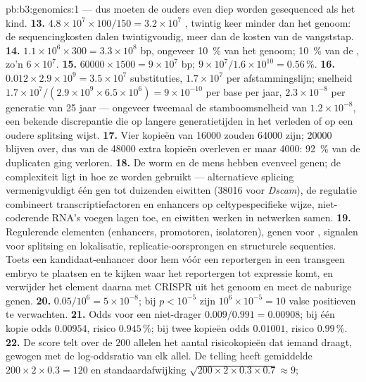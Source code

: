 \begin{solution}{pb:b3:genomics:1}
--- dus moeten de ouders even diep worden gesequenced als het kind.
\textbf{13.} $4.8\times 10^{7}\times 100/150 = 3.2\times 10^{7}$ ,
twintig keer minder dan het genoom: de sequencingkosten dalen
twintigvoudig, meer dan de kosten van de vangststap.
\textbf{14.} $1.1\times 10^{6}\times 300 = 3.3\times 10^{8}$ bp, ongeveer
\qty{10}{\%} van het genoom; \qty{10}{\%} van de , zo'n $6\times
10^{7}$.
\textbf{15.} $\num{60000}\times 1500 = 9\times 10^{7}$ bp; $9\times
10^{7}/1.6\times 10^{10} = 0.56\,\%$.
\textbf{16.} $0.012\times 2.9\times 10^{9} = 3.5\times 10^{7}$
substituties, $1.7\times 10^{7}$ per afstammingslijn; snelheid $1.7\times
10^{7}/(2.9\times 10^{9}\times 6.5\times 10^{6}) = 9\times 10^{-10}$
per base per jaar, $2.3\times 10^{-8}$ per generatie van 25 jaar ---
ongeveer tweemaal de stamboomsnelheid van $1.2\times 10^{-8}$, een
bekende discrepantie die op langere generatietijden in het verleden of
op een oudere splitsing wijst.
\textbf{17.} Vier kopieën van \num{16000} zouden \num{64000} zijn;
\num{20000} blijven over, dus van de \num{48000} extra kopieën
overleven er maar \num{4000}: \qty{92}{\%} van de duplicaten ging
verloren.
\textbf{18.} De worm en de mens hebben evenveel genen; de complexiteit
ligt in hoe ze worden gebruikt --- alternatieve splicing vermenigvuldigt
één gen tot duizenden eiwitten (\num{38016} voor \emph{Dscam}), de
regulatie combineert transcriptiefactoren en enhancers op
celtypespecifieke wijze, niet-coderende RNA's voegen lagen toe, en
eiwitten werken in netwerken samen.
\textbf{19.} Regulerende elementen (enhancers, promotoren, isolatoren),
genen voor , signalen voor splitsing en lokalisatie,
replicatie-oorsprongen en structurele sequenties. Toets een
kandidaat-enhancer door hem vóór een reportergen in een transgeen embryo
te plaatsen en te kijken waar het reportergen tot expressie komt, en
verwijder het element daarna met CRISPR uit het genoom en meet de
naburige genen.
\textbf{20.} $0.05/10^{6} = 5\times 10^{-8}$; bij $p < 10^{-5}$ zijn
$10^{6}
\times 10^{-5} = 10$ valse positieven te verwachten.
\textbf{21.} Odds voor een niet-drager $0.009/0.991 = 0.00908$; bij één
kopie odds $0.00954$, risico $0.945\,\%$; bij twee kopieën odds
$0.01001$, risico $0.99\,\%$.
\textbf{22.} De score telt over de $200$ allelen het aantal
risicokopieën dat iemand draagt, gewogen met de log-oddsratio van elk
allel. De telling heeft gemiddelde $200\times 2\times 0.3 = 120$ en
standaardafwijking $\sqrt{200\times 2\times 0.3\times 0.7} \approx 9$;

\end{solution}
